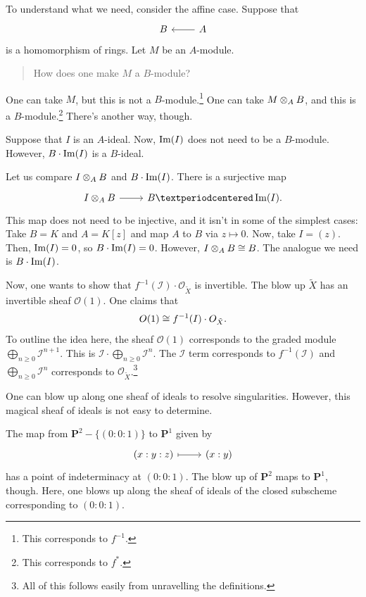 \documentclass [11 pt, oneside] {article}
\begin{document}
To understand what we need, consider the affine case. Suppose that
\[
\begin{tikzcd}
	B&A\ar[l]
\end{tikzcd}
\]
is a homomorphism of rings. Let $M$ be an $A$-module.
\begin{quote}
	\small How does one make $M$ a $B$-module?
\end{quote}
One can take $M$, but this is not a $B$-module.\footnote{This corresponds to $f^{-1}$.} One can take $M\otimes_A B$, and this is a $B$-module.\footnote{This corresponds to $f^*$.} There's another way, though.

Suppose that $I$ is an $A$-ideal. Now, $\operatorname{Im}(I)$ does not need to be a $B$-module. However, $B\cdot\operatorname{Im}(I)$ is a $B$-ideal. 

Let us compare $I\otimes_A B$ and $B\cdot \operatorname{Im}(I)$.
There is a surjective map
\[
\begin{tikzcd}
	 I\tensor_A B \ar[r] & B· \Img(I).
\end{tikzcd}
\]
This map does not need to be injective, and it isn't in some of the simplest cases: Take $B= K$ and $A = K[z]$ and map $A$ to $B$ via $z\longmapsto 0$.
Now, take $I = (z)$. Then, $\operatorname{Im}(I)=0$, so $B\cdot \operatorname{Im}(I)=0$.
However, $I\otimes_A B \cong B$. 
The analogue we need is $B\cdot \operatorname{Im}(I)$.

Now, one wants to show that $f^{-1}(\mathscr{I}) \cdot \mathscr{O}_{\tilde X}$ is invertible.
The blow up $\tilde X$ has an invertible sheaf $\mathscr{O}(1)$. One claims that
\begin{align*}
	\relax{O}(1)\cong f ^{-1}(\relax{I}) \cdot \relax{O}_{\tilde X}.
\end{align*}
To outline the idea here, the sheaf $\mathscr{O}(1)$ corresponds to the graded module $\bigoplus_{n\ge 0}\mathscr{I}^{n+1}$. This is $\mathscr{I}\cdot \bigoplus_{n\ge 0}\mathscr{I}^n$. The $\mathscr{I}$ term corresponds to $f^{-1}(\mathscr{I})$ and $\bigoplus_{n\ge 0}\mathscr{I}^n$ corresponds to $\mathscr{O}_{\tilde X}$.\footnote{All of this follows easily from unravelling the definitions.}

\begin{remark}
	One can blow up along one sheaf of ideals to resolve singularities. However, this magical sheaf of ideals is not easy to determine.
\end{remark}

\begin{example}\label{}\text{}
The map from $\mathbf{P}^2-\{(0:0:1)\}$ to $\mathbf{P}^1$ given by
\[
\begin{tikzcd}
	(x:y:z)\ar[r,mapsto] &  (x:y)
\end{tikzcd}
\]
has a point of indeterminacy at $(0:0:1)$. The blow up of $\mathbf{P}^2$ maps to $\mathbf{P}^1$, though.
Here, one blows up along the sheaf of ideals of the closed subscheme corresponding to $(0:0:1)$.
\end{example}
\end{document}

